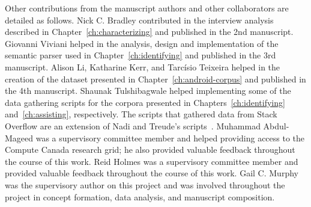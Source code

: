 Other contributions from the manuscript authors and other collaborators are detailed as follows.
Nick C. Bradley contributed in
the interview analysis described in Chapter~\ref{ch:characterizing} and published in the 2nd manuscript.
Giovanni Viviani helped in the analysis, design and implementation of the 
semantic parser used in Chapter~\ref{ch:identifying} and published in the 3rd manuscript.
Alison Li, Katharine Kerr, and Tarc{\'i}sio Teixeira helped 
in the creation of the dataset presented in Chapter~\ref{ch:android-corpus} and published in the 4th manuscript.
Shaunak Tulshibagwale helped implementing some of the 
data gathering scripts for the 
corpora presented in Chapters~\ref{ch:identifying} and~\ref{ch:assisting}, respectively.
The scripts that gathered data from Stack Overflow are an extension of 
 Nadi and Treude's scripts~\cite{nadi2019Rep}.
Muhammad Abdul-Mageed was a supervisory committee member and helped providing access to the 
Compute Canada research grid; he also provided valuable feedback throughout the course of this work. 
Reid Holmes was a supervisory committee member and provided valuable feedback throughout the course of this work. 
Gail C. Murphy was the supervisory author on this project
and was involved throughout the project in concept formation, data analysis, and
manuscript composition.

